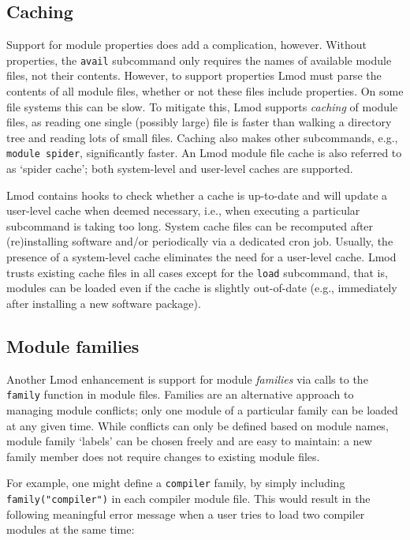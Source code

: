 \subsection{Caching}

Support for module properties does add a complication, however.
Without properties, the \texttt{\small avail} subcommand only requires the
names of available module files, not their contents.  However, to support properties Lmod
must parse the contents of all module files, whether or not these files include
properties. On some file systems this can be slow.  To mitigate this, Lmod supports
\emph{caching} of module files, as reading one single (possibly large)
file is faster than walking a directory tree and reading lots of small files.
Caching also makes other subcommands, e.g., \texttt{\small module spider},
significantly faster. An Lmod module file cache is also referred to as
`spider cache'; both system-level and user-level caches are supported.

Lmod contains hooks to check whether a cache is up-to-date and will
update a user-level cache when deemed necessary, i.e., when executing a particular
subcommand is taking too long. System cache files can be recomputed after (re)installing 
software and/or periodically via a dedicated cron job. Usually, the presence of a
system-level cache eliminates the need for a user-level cache. Lmod trusts existing
cache files in all cases except for the \texttt{\small load} subcommand, that is,
modules can be loaded even if the cache is slightly out-of-date
(e.g., immediately after installing a new software package).


\subsection{Module families}

Another Lmod enhancement is support for module
\emph{families} via calls to the \texttt{\small family} function in module files.
Families are an alternative approach to managing module conflicts; only one module of
a particular family can be loaded at any given time. While conflicts can only be
defined based on module names, module family `labels' can be chosen freely and
are easy to maintain: a new family member does not require changes to existing
module files.

For example, one might define a \texttt{\small compiler} family, by
simply including \texttt{\small family("compiler")} in each compiler module file.
This would result in the following meaningful error message when a user tries to
load two compiler modules at the same time:

